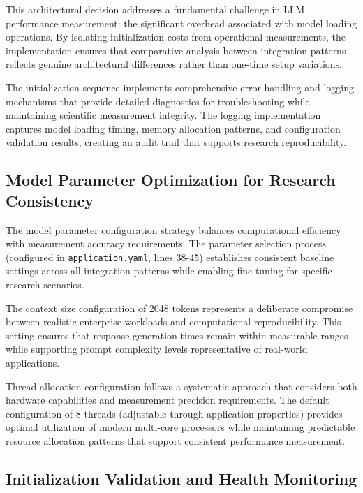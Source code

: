 
This architectural decision addresses a fundamental challenge in LLM performance measurement: the significant overhead associated with model loading operations. By isolating initialization costs from operational measurements, the implementation ensures that comparative analysis between integration patterns reflects genuine architectural differences rather than one-time setup variations.

The initialization sequence implements comprehensive error handling and logging mechanisms that provide detailed diagnostics for troubleshooting while maintaining scientific measurement integrity. The logging implementation captures model loading timing, memory allocation patterns, and configuration validation results, creating an audit trail that supports research reproducibility.

\subsection{Model Parameter Optimization for Research Consistency}

The model parameter configuration strategy balances computational efficiency with measurement accuracy requirements. The parameter selection process (configured in \texttt{application.yaml}, lines 38-45) establishes consistent baseline settings across all integration patterns while enabling fine-tuning for specific research scenarios.


The context size configuration of 2048 tokens represents a deliberate compromise between realistic enterprise workloads and computational reproducibility. This setting ensures that response generation times remain within measurable ranges while supporting prompt complexity levels representative of real-world applications.

Thread allocation configuration follows a systematic approach that considers both hardware capabilities and measurement precision requirements. The default configuration of 8 threads (adjustable through application properties) provides optimal utilization of modern multi-core processors while maintaining predictable resource allocation patterns that support consistent performance measurement.

\subsection{Initialization Validation and Health Monitoring}

